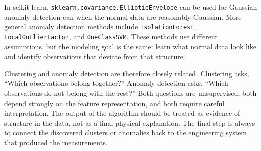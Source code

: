 \documentclass[12pt,letter]{article}
\begin{document}
In scikit-learn, \texttt{sklearn.covariance.EllipticEnvelope} can be used for Gaussian anomaly detection can when the normal data are reasonably Gaussian. More general anomaly detection methods include \texttt{IsolationForest}, \texttt{LocalOutlierFactor}, and \texttt{OneClassSVM}. These methods use different assumptions, but the modeling goal is the same: learn what normal data look like and identify observations that deviate from that structure.

Clustering and anomaly detection are therefore closely related. Clustering asks, ``Which observations belong together?'' Anomaly detection asks, ``Which observations do not belong with the rest?'' Both questions are unsupervised, both depend strongly on the feature representation, and both require careful interpretation. The output of the algorithm should be treated as evidence of structure in the data, not as a final physical explanation. The final step is always to connect the discovered clusters or anomalies back to the engineering system that produced the measurements.
\end{document}

